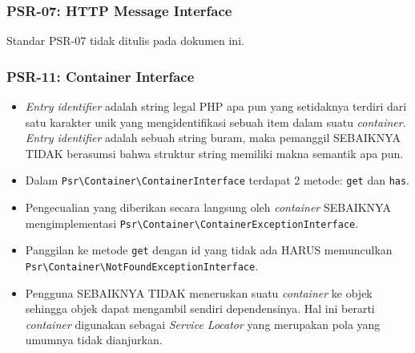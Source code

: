 \subsubsection{PSR-07: HTTP Message Interface}
\label{subsubsec:psr07}
Standar PSR-07 tidak ditulis pada dokumen ini.
\begin{comment}
\begin{itemize}
	\item Pesan HTTP dapat berupa permintaan dari klien ke server atau respons dari server ke klien.
	\item MUST
	\item SHOULD
	\item Selama konstruksi, implementasi HARUS berusaha menyetel header  \verb|Host| dari URI yang disediakan jika tidak ada header \verb|Host| yang tersedia.
	\item Klien HTTP HARUS mengabaikan nilai dari \verb|Uri::getPath()| dan \verb|Uri::getQuery()|, sebaliknya menggunakan nilai yang dikembalikan oleh \verb|getRequestTarget()|, yang secara default menggabungkan kedua nilai ini.
	\item Klien yang memilih untuk tidak mengimplementasi 1 atau lebih dari 4 formulir \textit{request-target}, HARUS tetap menggunakan \verb|RequestTarget()|. Klien-klien ini HARUS menolak \textit{request-target} yang tidak mereka dukung, dan DILARANG kembali ke nilai dari \verb|getUri()|.
\end{itemize}
\end{comment}

\subsubsection{PSR-11: Container Interface}
\label{subsubsec:psr11}
\begin{itemize}
	\item \textit{Entry identifier} adalah string legal PHP apa pun yang setidaknya terdiri dari satu karakter unik yang mengidentifikasi sebuah item dalam suatu \textit{container}. \textit{Entry identifier} adalah sebuah string buram, maka pemanggil SEBAIKNYA TIDAK berasumsi bahwa struktur string memiliki makna semantik apa pun.
	\item Dalam \verb|Psr\Container\ContainerInterface| terdapat 2 metode: \verb|get| dan \verb|has|.
	\item Pengecualian yang diberikan secara langsung oleh \textit{container} SEBAIKNYA mengimplementasi \verb|Psr\Container\ContainerExceptionInterface|.
	\item Panggilan ke metode \verb|get| dengan id yang tidak ada HARUS memunculkan \verb|Psr\Container\NotFoundExceptionInterface|.
	\item Pengguna SEBAIKNYA TIDAK meneruskan suatu \textit{container} ke objek sehingga objek dapat mengambil sendiri dependensinya. Hal ini berarti \textit{container} digunakan sebagai \textit{Service Locator} yang merupakan pola yang umumnya tidak dianjurkan.
\end{itemize}

